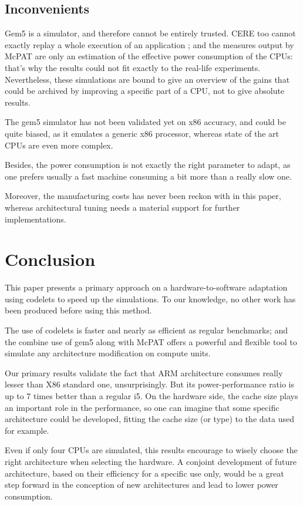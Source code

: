 \documentclass{article}
\begin{document}
\begin{multicols}{2}
\subsection{Inconvenients}
Gem5 is a simulator, and therefore cannot be entirely trusted. CERE too cannot exactly replay a whole execution of an application ; and the measures output by McPAT are only an estimation of the effective power consumption of the CPUs: that's why the results could not fit exactly to the real-life experiments. Nevertheless, these simulations are bound to give an overview of the gains that could be archived by improving a specific part of a CPU, not to give absolute results.

The gem5 simulator has not been validated yet on x86 accuracy, and could be quite biased, as it emulates a generic x86 processor, whereas state of the art CPUs are even more complex.

Besides, the power consumption is not exactly the right parameter to adapt, as one prefers usually a fast machine consuming a bit more than a really slow one.

Moreover, the manufacturing costs has never been reckon with in this paper, whereas architectural tuning needs a material support for further implementations. 


\section{Conclusion}
\label{ccl}
This paper presents a primary approach on a hardware-to-software adaptation using codelets to speed up the simulations. To our knowledge, no other work has been produced before using this method.

The use of codelets is faster and nearly as efficient as regular benchmarks; and the combine use of gem5 along with McPAT offers a powerful and flexible tool to simulate any architecture modification on compute units.

Our primary results validate the fact that ARM architecture consumes really lesser than X86 standard one, unsurprisingly. But its power-performance ratio is up to 7 times better than a regular i5. On the hardware side, the cache size plays an important role in the performance, so one can imagine that some specific architecture could be developed, fitting the cache size (or type) to the data used for example.

Even if only four CPUs are simulated, this results encourage to wisely choose the right architecture when selecting the hardware. A conjoint development of future architecture, based on their efficiency for a specific use only, would be a great step forward in the conception of new architectures and lead to lower power consumption. 


\end{multicols}
\end{document}
